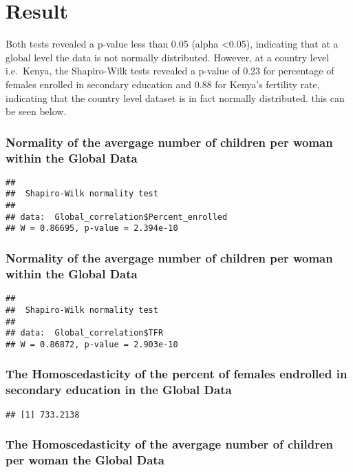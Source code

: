 \documentclass[11pt,]{article}
\begin{document}
\section{Result}\label{result}

Both tests revealed a p-value less than 0.05 (alpha \textless{}0.05),
indicating that at a global level the data is not normally distributed.
However, at a country level i.e.~Kenya, the Shapiro-Wilk tests revealed
a p-value of 0.23 for percentage of females enrolled in secondary
education and 0.88 for Kenya's fertility rate, indicating that the
country level dataset is in fact normally distributed. this can be seen
below.

\subsubsection{Normality of the avergage number of children per woman
within the Global
Data}\label{normality-of-the-avergage-number-of-children-per-woman-within-the-global-data}

\begin{verbatim}
## 
##  Shapiro-Wilk normality test
## 
## data:  Global_correlation$Percent_enrolled
## W = 0.86695, p-value = 2.394e-10
\end{verbatim}

\subsubsection{Normality of the avergage number of children per woman
within the Global
Data}\label{normality-of-the-avergage-number-of-children-per-woman-within-the-global-data-1}

\begin{verbatim}
## 
##  Shapiro-Wilk normality test
## 
## data:  Global_correlation$TFR
## W = 0.86872, p-value = 2.903e-10
\end{verbatim}

\subsubsection{The Homoscedasticity of the percent of females endrolled
in secondary education in the Global
Data}\label{the-homoscedasticity-of-the-percent-of-females-endrolled-in-secondary-education-in-the-global-data}

\begin{verbatim}
## [1] 733.2138
\end{verbatim}

\subsubsection{The Homoscedasticity of the avergage number of children
per woman the Global
Data}\label{the-homoscedasticity-of-the-avergage-number-of-children-per-woman-the-global-data}
\end{document}
